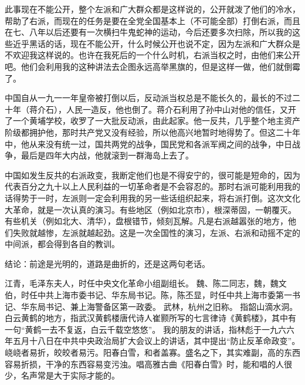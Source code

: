 此事现在不能公开，整个左派和广大群众都是这样说的，公开就泼了他们的冷水，帮助了右派，而现在的任务是要在全党全国基本上（不可能全部）打倒右派，而且在七、八年以后还要有一次横扫牛鬼蛇神的运动，今后还要多次扫除，所以我的这些近乎黑话的话，现在不能公开，什么时候公开也说不定，因为左派和广大群众是不欢迎我这样说的。也许在我死后的一个什么时机，右派当权之时，由他们来公开吧。他们会利用我的这种讲法去企图永远高举黑旗的，但是这样一做，他们就倒霉了。

中国自从一九一一年皇帝被打倒以后，反动派当权总是不能长久的，最长的不过二十年（蒋介石），人民一造反，他也倒了。蒋介石利用了孙中山对他的信任，又开了一个黄埔学校，收罗了一大批反动派，由此起家。他一反共，几乎整个地主资产阶级都拥护他，那时共产党又没有经验，所以他高兴地暂时地得势了。但这二十年中，他从来没有统一过，国共两党的战争，国民党和各派军阀之间的战争，中日战争，最后是四年大内战，他就滚到一群海岛上去了。

中国如发生反共的右派政变，我断定他们也是不得安宁的，很可能是短命的，因为代表百分之九十以上人民利益的一切革命者是不会容忍的。那时右派可能利用我的话得势于一时，左派则一定会利用我的另一些话组织起来，将右派打倒。这次文化大革命，就是一次认真的演习。有些地区（例如北京市），根深蒂固，一朝覆灭。有些机关（例如北大、清华），盘根错节，倾刻瓦解。凡是右派越嚣张的地方，他们失败就越惨，左派就越起劲。这是一次全国性的演习，左派、右派和动摇不定的中间派，都会得到各自的教训。

结论：前途是光明的，道路是曲折的，还是这两句老话。

\begin{maonote}
江青，毛泽东夫人，时任中央文化革命小组副组长。
魏、陈二同志，魏，魏文伯，时任中共上海市委书记、华东局书记。陈，陈丕显，时任中共上海市委第一书记、华东局书记、兼上海警备区第一政委。
武林，杭州之旧称。
指韶山滴水洞。
白云黄鹤的地方，指武汉黄鹤楼唐代诗人崔颢所写的七言律诗《黄鹤楼》，其中有一句“黄鹤一去不复返，白云千载空悠悠”。
我的朋友的讲话，指林彪于一九六六年五月十八日在中共中央政治局扩大会议上的讲话，其中提出“防止反革命政变”。
峣峣者易折，皎皎者易污。阳春白雪，和者盖寡。盛名之下，其实难副，高的东西容易折损，干净的东西容易变污浊。唱高雅古曲《阳春白雪》时，能和唱的人很少，名声常是大于实际才能的。
\end{maonote}
